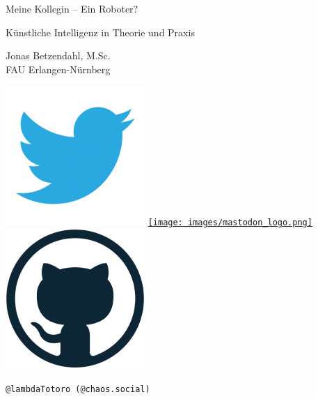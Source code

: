 \documentclass[aspectratio=169,xcolor=dvipsnames]{beamer}
\begin{document}
\begin{frame}
\begin{center}
\vfill
\huge Meine Kollegin -- Ein Roboter?
\normalsize 
\smallskip
\smallskip

Künstliche Intelligenz in Theorie und Praxis
\bigskip\bigskip

\large Jonas Betzendahl, M.Sc.\\\normalsize FAU Erlangen-Nürnberg
\bigskip\bigskip\large

\href{https://twitter.com/lambdatotoro}{\includegraphics[scale=0.125]{images/twitter_logo.png}}
\href{https://chaos.social/@lambdatotoro}{\texttt{[image: images/mastodon\_logo.png]}}
\href{https://github.com/lambdaTotoro}{\includegraphics[scale=0.125]{images/github_logo.png}}

\texttt{@lambdaTotoro (@chaos.social)}
\end{center}
\end{frame}

\end{document}
